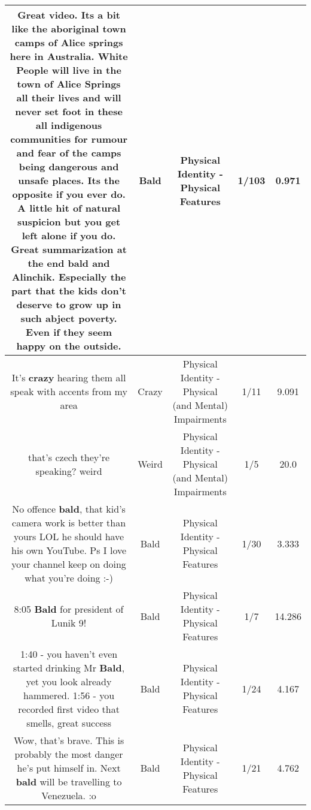 \documentclass[11pt]{article}
\newlength\mylength
\begin{document}
\begin{center}
\begin{longtable}{|C{.65\mylength}|C{.30\mylength}|C{.12\mylength}|C{.12\mylength}|C{.12\mylength}|}
  \small Great video. Its a bit like the aboriginal town camps of Alice springs here in Australia. White People will live in the town of Alice Springs all their lives and will never set foot in these all indigenous communities for rumour and fear of the camps being dangerous and unsafe places. Its the opposite if you ever do. A little hit of natural suspicion but you get left alone if you do. Great summarization at the end \textbf{bald} and Alinchik. Especially the part that the kids don't deserve to grow up in such abject poverty. Even if they seem happy on the outside.\normalsize   & Bald & Physical Identity - Physical Features & 1/103 & 0.971 \\  \hline
  \small It's \textbf{crazy} hearing them all speak with accents from my area\normalsize   & Crazy & Physical Identity - Physical (and Mental) Impairments & 1/11 & 9.091 \\  \hline
  \small that's czech they're speaking? weird\normalsize   & Weird & Physical Identity - Physical (and Mental) Impairments & 1/5 & 20.0 \\  \hline
  \small No offence \textbf{bald}, that kid's camera work is better than yours LOL he should have his own YouTube. Ps I love your channel keep on doing what you're doing ️:-)\normalsize   & Bald & Physical Identity - Physical Features & 1/30 & 3.333 \\  \hline
  \small 8:05 \textbf{Bald} for president of Lunik 9!\normalsize   & Bald & Physical Identity - Physical Features & 1/7 & 14.286 \\  \hline
  \small 1:40 - you haven't even started drinking Mr \textbf{Bald}, yet you look already hammered. 1:56 - you recorded first video that smells, great success\normalsize   & Bald & Physical Identity - Physical Features & 1/24 & 4.167 \\  \hline
  \small Wow, that's brave. This is probably the most danger he's put himself in. Next \textbf{bald} will be travelling to Venezuela.  :o\normalsize   & Bald & Physical Identity - Physical Features & 1/21 & 4.762 \\  \hline

\end{longtable}
\end{center}
\end{document}
